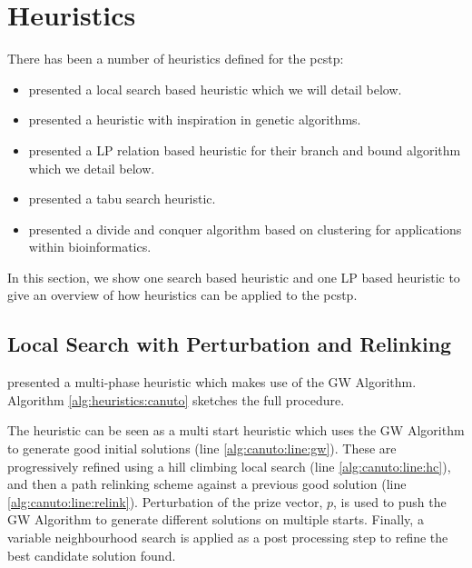 \section{Heuristics}\label{sec:solving:heuristics}
There has been a number of heuristics defined for the \gls{pcstp}:

\begin{itemize}
\item \citet{canuto2001local} presented a local search based heuristic which we
   will detail below.
 \item \citet{Ljubic:2004:memetic} presented a heuristic with inspiration in genetic
   algorithms.
 \item \citet{ljubic2005solving} presented a LP relation based heuristic for their branch
   and bound algorithm which we detail below.
\item \citet{fu2014knowledge} presented a tabu search heuristic.
 \item \citet{akhmedov2016divide} presented a divide and conquer algorithm based on clustering
    for applications within bioinformatics.
\end{itemize}
In this section, we show one search based heuristic and one LP based heuristic to give
an overview of how heuristics can be applied to the \gls{pcstp}.
\subsection{Local Search with Perturbation and Relinking}\label{sec:canuto-search}

\citet{canuto2001local} presented a multi-phase heuristic which makes use of the GW Algorithm.
 Algorithm \ref{alg:heuristics:canuto} sketches the full procedure. 

 The heuristic can be seen as a multi start heuristic which uses the GW Algorithm
 to generate good initial
 solutions (line \ref{alg:canuto:line:gw}).
 These are progressively refined using a hill climbing local search
 (line \ref{alg:canuto:line:hc}),
 and then a path relinking scheme against a previous good solution
 (line \ref{alg:canuto:line:relink}).
 Perturbation of the prize vector, $p$, is used to push the GW Algorithm to generate
 different solutions on multiple starts. Finally, a
 variable neighbourhood search is applied as a
 post processing step to refine the best candidate solution found.


